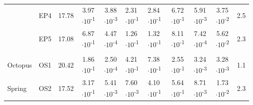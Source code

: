 {\begin{landscape}
\begin{table}
\begin{adjustbox}{width=600pt,keepaspectratio}
\begin{threeparttable}
\begin{tabular}{lccccllcccc}
      & EP4   & 17.78 & 3.97$\cdot 10$\textsuperscript{-1} & 3.88$\cdot 10$\textsuperscript{-3} & 2.31$\cdot 10$\textsuperscript{-1} & 2.84$\cdot 10$\textsuperscript{-1} & 6.72$\cdot 10$\textsuperscript{-1} & 5.91$\cdot 10$\textsuperscript{-3} & 3.75$\cdot 10$\textsuperscript{-2} & 2.5 \\
      & EP5   & 17.08 & 6.87$\cdot 10$\textsuperscript{-1} & 4.47$\cdot 10$\textsuperscript{-4} & 1.26$\cdot 10$\textsuperscript{-1} & 1.32$\cdot 10$\textsuperscript{-1} & 8.11$\cdot 10$\textsuperscript{-1} & 7.42$\cdot 10$\textsuperscript{-4} & 5.62$\cdot 10$\textsuperscript{-2} & 2.3 \\
      &       &       &       &       &       &       &       &       &       &  \\
Octopus & OS1   & 20.42 & 1.86$\cdot 10$\textsuperscript{-1} & 2.50$\cdot 10$\textsuperscript{-4} & 4.21$\cdot 10$\textsuperscript{-1} & 7.38$\cdot 10$\textsuperscript{-1} & 2.55$\cdot 10$\textsuperscript{-1} & 3.24$\cdot 10$\textsuperscript{-3} & 3.28$\cdot 10$\textsuperscript{-3} & 1.1 \\
Spring & OS2   & 17.52 & 3.17$\cdot 10$\textsuperscript{-1} & 5.41$\cdot 10$\textsuperscript{-3} & 7.60$\cdot 10$\textsuperscript{-3} & 4.10$\cdot 10$\textsuperscript{-1} & 5.64$\cdot 10$\textsuperscript{-1} & 8.71$\cdot 10$\textsuperscript{-3} & 1.73$\cdot 10$\textsuperscript{-2} & 2.3 \\
\bottomrule
\end{tabular}%


\begin{tablenotes}
\item

\end{tablenotes}

  \label{tab:mods}
  \end{threeparttable}
  \end{adjustbox}
\end{table}

\end{landscape}
\doublespace
\clearpage
}



